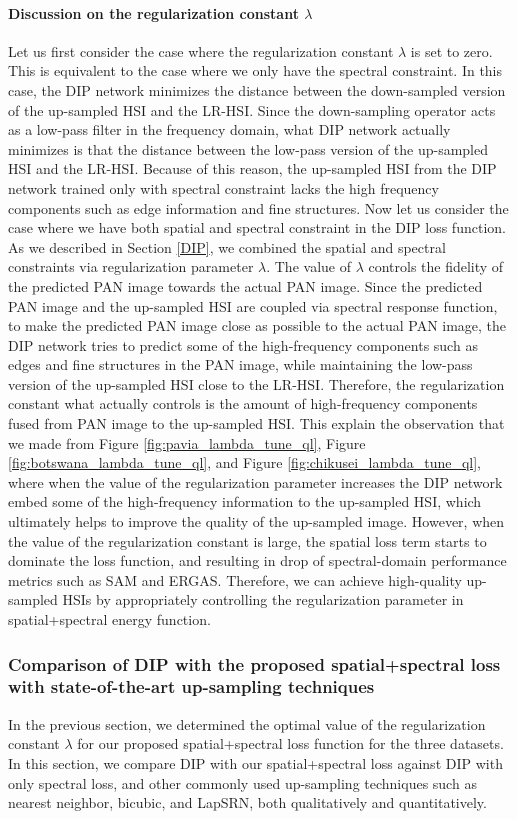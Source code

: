 \documentclass[journal]{IEEEtran}
\begin{document}
    \paragraph*{Discussion on the regularization constant $\lambda$} Let us first consider the case where the regularization constant $\lambda$ is set to zero. This is equivalent to the case where we only have the spectral constraint. In this case, the DIP network minimizes the distance between the down-sampled version of the up-sampled HSI and the LR-HSI. Since the down-sampling operator acts as a low-pass filter in the frequency domain, what DIP network actually minimizes is that the distance between the low-pass version of the up-sampled HSI and the LR-HSI. Because of this reason, the up-sampled HSI from the DIP network trained only with spectral constraint lacks the high frequency components such as edge information and fine structures. Now let us consider the case where we have both spatial and spectral constraint in the DIP loss function. As we described in Section \ref{DIP}, we combined the spatial and spectral constraints via regularization parameter $\lambda$. The value of $\lambda$ controls the fidelity of the predicted PAN image towards the actual PAN image. Since the predicted PAN image and the up-sampled HSI are coupled via spectral response function, to make the predicted PAN image close as possible to the actual PAN image, the DIP network tries to predict some of the high-frequency components such as edges and fine structures in the PAN image,  while maintaining the low-pass version of the up-sampled HSI close to the LR-HSI. Therefore, the regularization constant what actually controls is the amount of high-frequency components fused from PAN image to the up-sampled HSI. This explain the observation that we made from Figure \ref{fig:pavia_lambda_tune_ql}, Figure \ref{fig:botswana_lambda_tune_ql}, and Figure \ref{fig:chikusei_lambda_tune_ql}, where when the value of the regularization parameter increases the DIP network embed some of the high-frequency information to the up-sampled HSI, which ultimately helps to improve the quality of the up-sampled image. However, when the value of the regularization constant is large, the spatial loss term starts to dominate  the loss function, and resulting in drop of spectral-domain performance metrics such as SAM and ERGAS. Therefore, we can achieve high-quality up-sampled HSIs by appropriately controlling the regularization parameter in spatial+spectral energy function.
    
    \subsubsection{Comparison of DIP with the proposed spatial+spectral loss with state-of-the-art up-sampling techniques} In the previous section, we determined the optimal value of the regularization constant $ \lambda $ for our proposed spatial+spectral loss function for the three datasets. In this section, we compare DIP with our spatial+spectral loss against DIP with only spectral loss, and other commonly used up-sampling techniques such as nearest neighbor, bicubic, and LapSRN, both qualitatively and quantitatively. 
    
\end{document}
